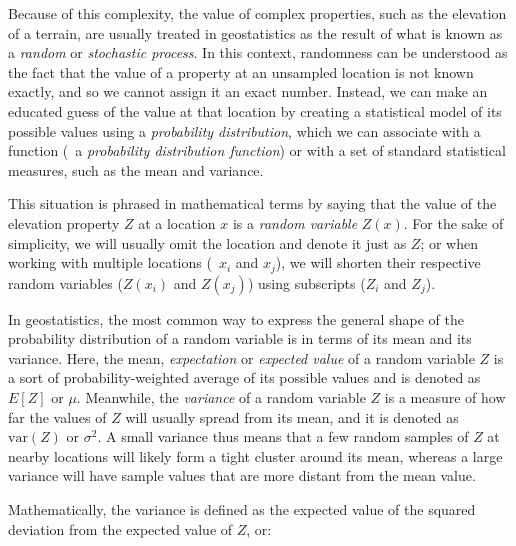Because of this complexity, the value of complex properties, such as the elevation of a terrain, are usually treated in geostatistics as the result of what is known as a \emph{random} or \emph{stochastic process}.
In this context, randomness can be understood as the fact that the value of a property at an unsampled location is not known exactly, and so we cannot assign it an exact number.
Instead, we can make an educated guess of the value at that location by creating a statistical model of its possible values using a \emph{probability distribution}, which we can associate with a function (\ie\ a \emph{probability distribution function}) or with a set of standard statistical measures, such as the mean and variance.

This situation is phrased in mathematical terms by saying that the value of the elevation property \(Z\) at a location \(x\) is a \emph{random variable} \(Z(x)\).
For the sake of simplicity, we will usually omit the location and denote it just as \(Z\); or when working with multiple locations (\eg\ \(x_i\) and \(x_j\)), we will shorten their respective random variables (\(Z(x_i)\) and \(Z(x_j)\)) using subscripts (\(Z_i\) and \(Z_j\)).

In geostatistics, the most common way to express the general shape of the probability distribution of a random variable is in terms of its mean and its variance.
Here, the mean, \emph{expectation} or \emph{expected value} of a random variable \(Z\) is a sort of probability-weighted average of its possible values and is denoted as \(E[Z]\) or \(\mu\).
Meanwhile, the \emph{variance} of a random variable \(Z\) is a measure of how far the values of \(Z\) will usually spread from its mean, and it is denoted as \(\mathrm{var}(Z)\) or \(\sigma^2\).
A small variance thus means that a few random samples of \(Z\) at nearby locations will likely form a tight cluster around its mean, whereas a large variance will have sample values that are more distant from the mean value.

Mathematically, the variance is defined as the expected value of the squared deviation from the expected value of \(Z\), or:

